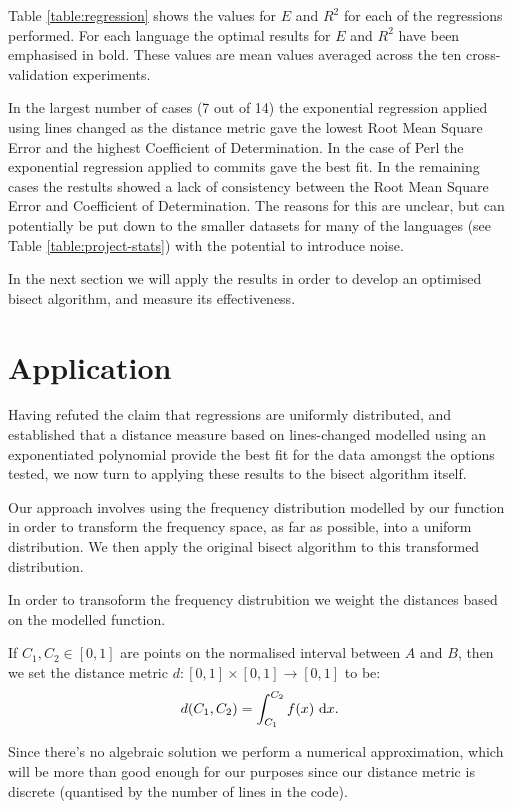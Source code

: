 \documentclass[10pt,journal,compsoc]{IEEEtran}
\begin{document}
Table \ref{table:regression} shows the values for $E$ and $R^2$ for each of the regressions performed. For each language the optimal results for $E$ and $R^2$ have been emphasised in bold. These values are mean values averaged across the ten cross-validation experiments.

In the largest number of cases (7 out of 14) the exponential regression applied using lines changed as the distance metric gave the lowest Root Mean Square Error and the highest Coefficient of Determination. In the case of Perl the exponential regression applied to commits gave the best fit. In the remaining cases the restults showed a lack of consistency between the Root Mean Square Error and Coefficient of Determination. The reasons for this are unclear, but can potentially be put down to the smaller datasets for many of the languages (see Table \ref{table:project-stats}) with the potential to introduce noise.

In the next section we will apply the results in order to develop an optimised bisect algorithm, and measure its effectiveness.

\section{Application}

Having refuted the claim that regressions are uniformly distributed, and established that a distance measure based on lines-changed modelled using an exponentiated polynomial provide the best fit for the data amongst the options tested, we now turn to applying these results to the bisect algorithm itself.

Our approach involves using the frequency distribution modelled by our function in order to transform the frequency space, as far as possible, into a uniform distribution. We then apply the original bisect algorithm to this transformed distribution.

In order to transoform the frequency distrubition we weight the distances based on the modelled function.

If $C_1, C_2 \in [0, 1]$ are points on the normalised interval between $A$ and $B$, then we set the distance metric $d : [0, 1] \times [ 0, 1 ] \to [ 0, 1 ]$ to be:
$$
d(C_1, C_2) = \int_{C_1}^{C_2} f(x) \ {\rm d}x .
$$

Since there's no algebraic solution we perform a numerical approximation, which will be more than good enough for our purposes since our distance metric is discrete (quantised by the number of lines in the code).
\end{document}
